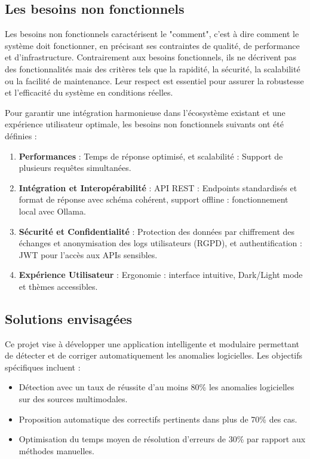 \documentclass[12pt,a4paper]{report}
\begin{document}
	\subsection{Les besoins non fonctionnels}
	
	Les besoins non fonctionnels caractérisent le "comment", c'est à dire comment le système doit fonctionner, en précisant ses contraintes de qualité, de performance et d’infrastructure. Contrairement aux besoins fonctionnels, ils ne décrivent pas des fonctionnalités mais des critères tels que la rapidité, la sécurité, la scalabilité ou la facilité de maintenance. Leur respect est essentiel pour assurer la robustesse et l’efficacité du système en conditions réelles.
	
	Pour garantir une intégration harmonieuse dans l’écosystème existant et une expérience utilisateur optimale, les besoins non fonctionnels suivants ont été définies :
	
	\begin{enumerate}
		
		\item \textbf{Performances} : Temps de réponse optimisé, et scalabilité : Support de plusieurs requêtes simultanées.
		
		\item \textbf{Intégration et Interopérabilité} : API REST : Endpoints standardisés et format de réponse avec schéma cohérent, support offline : fonctionnement local avec Ollama.
		
		\item \textbf{Sécurité et Confidentialité} : Protection des données par chiffrement des échanges et anonymisation des logs utilisateurs (RGPD), et authentification : JWT pour l’accès aux APIs sensibles.	
		
		\item \textbf{Expérience Utilisateur} : Ergonomie : interface intuitive, Dark/Light mode et thèmes accessibles.
		
		
	\end{enumerate}
	
	\subsection{Solutions envisagées}
	
	Ce projet vise à développer une application intelligente et modulaire permettant de détecter et de corriger automatiquement les anomalies logicielles. Les objectifs spécifiques incluent :
	
	\renewcommand{\labelitemi}{$\bullet$}
	\begin{itemize}
		\item Détection avec un taux de réussite d'au moins 80\% les anomalies logicielles sur des sources multimodales.
		
		\item Proposition automatique des correctifs pertinents dans plus de 70\% des cas.
		
		\item Optimisation du temps moyen de résolution d’erreurs de 30\% par rapport aux méthodes manuelles.
	\end{itemize}
	
\end{document}
